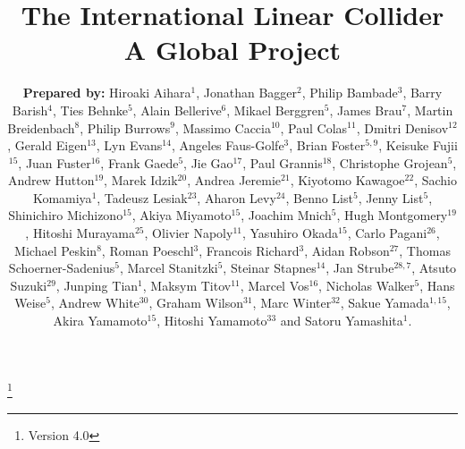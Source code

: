 \documentclass[%
 reprint,
 amsmath,amssymb,
 aps,
]{revtex4-1}
\begin{document}

\title{The International Linear Collider \\ A Global Project}%
\thanks{Version 4.0}%

\author{\textbf{Prepared by:}
Hiroaki Aihara$^1$, Jonathan Bagger$^2$, Philip Bambade$^3$, Barry Barish$^4$,  Ties Behnke$^5$, Alain Bellerive$^6$, Mikael Berggren$^5$, James Brau$^7$, Martin Breidenbach$^8$, Philip Burrows$^9$, Massimo Caccia$^{10}$, Paul Colas$^{11}$, Dmitri Denisov$^{12}$, Gerald Eigen$^{13}$, Lyn Evans$^{14}$, Angeles Faus-Golfe$^{3}$, Brian Foster$^{5,9}$, Keisuke Fujii$^{15}$, Juan Fuster$^{16}$, Frank Gaede$^{5}$, Jie Gao$^{17}$, Paul Grannis$^{18}$, Christophe Grojean$^{5}$, Andrew Hutton$^{19}$, Marek Idzik$^{20}$, Andrea Jeremie$^{21}$, Kiyotomo Kawagoe$^{22}$, Sachio Komamiya$^{1}$, Tadeusz Lesiak$^{23}$, Aharon Levy$^{24}$, Benno List$^{5}$, Jenny List$^{5}$, Shinichiro Michizono$^{15}$, Akiya Miyamoto$^{15}$, Joachim Mnich$^{5}$, Hugh Montgomery$^{19}$, Hitoshi Murayama$^{25}$, Olivier Napoly$^{11}$, Yasuhiro Okada$^{15}$, Carlo Pagani$^{26}$, Michael Peskin$^{8}$, Roman Poeschl$^{3}$, Francois Richard$^{3}$, Aidan Robson$^{27}$, Thomas Schoerner-Sadenius$^{5}$, Marcel Stanitzki$^5$, Steinar Stapnes$^{14}$, Jan Strube$^{28,7}$, Atsuto Suzuki$^{29}$, Junping Tian$^{1}$, Maksym Titov$^{11}$, Marcel Vos$^{16}$, Nicholas Walker$^{5}$, Hans Weise$^{5}$, Andrew White$^{30}$, Graham Wilson$^{31}$, Marc Winter$^{32}$, Sakue Yamada$^{1,15}$, Akira Yamamoto$^{15}$, Hitoshi Yamamoto$^{33}$ and Satoru Yamashita$^{1}$. }

  
\end{document}
